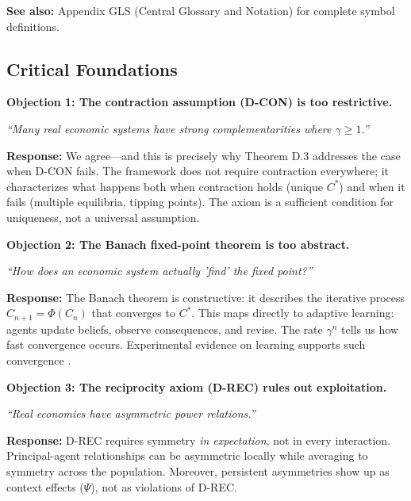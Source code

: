 \textbf{See also:} Appendix GLS (Central Glossary and Notation) for complete symbol definitions.


\subsection{Critical Foundations}
\label{sec:D-foundations}

\begin{tcolorbox}[colback=red!5!white, colframe=red!75!black,
    title=\textbf{Critical Foundations: Objections and Responses}]

\textbf{Objection 1: The contraction assumption (D-CON) is too restrictive.}

\textit{``Many real economic systems have strong complementarities where $\gamma \geq 1$.''}

\textbf{Response:} We agree---and this is precisely why Theorem D.3 addresses the
case when D-CON fails. The framework does not require contraction everywhere;
it characterizes what happens both when contraction holds (unique $C^*$) and
when it fails (multiple equilibria, tipping points). The axiom is a sufficient
condition for uniqueness, not a universal assumption.

\medskip

\textbf{Objection 2: The Banach fixed-point theorem is too abstract.}

\textit{``How does an economic system actually 'find' the fixed point?''}

\textbf{Response:} The Banach theorem is constructive: it describes the iterative
process $C_{n+1} = \Phi(C_n)$ that converges to $C^*$. This maps directly to
adaptive learning: agents update beliefs, observe consequences, and revise.
The rate $\gamma^n$ tells us how fast convergence occurs. Experimental evidence
on learning supports such convergence \citep{PAP-camerer2003behavioral}.

\medskip

\textbf{Objection 3: The reciprocity axiom (D-REC) rules out exploitation.}

\textit{``Real economies have asymmetric power relations.''}

\textbf{Response:} D-REC requires symmetry \emph{in expectation}, not in every
interaction. Principal-agent relationships can be asymmetric locally while
averaging to symmetry across the population. Moreover, persistent asymmetries
show up as context effects ($\Psi$), not as violations of D-REC.


\end{tcolorbox}
